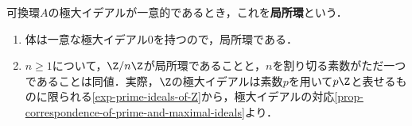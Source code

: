 \documentclass[uplatex,dvipdfmx]{jsreport}
\begin{document}
\begin{definition}
    可換環$A$の極大イデアルが一意的であるとき，これを\textbf{局所環}という．
\end{definition}
\begin{example}\mbox{}
    \begin{enumerate}
        \item 体は一意な極大イデアル$0$を持つので，局所環である．
        \item $n\ge 1$について，$\Z/n\Z$が局所環であることと，$n$を割り切る素数がただ一つであることは同値．実際，$\Z$の極大イデアルは素数$p$を用いて$p\Z$と表せるものに限られる\ref{exp-prime-ideals-of-Z}から，極大イデアルの対応\ref{prop-correspondence-of-prime-and-maximal-ideals}より．
    \end{enumerate}
\end{example}
\end{document}
